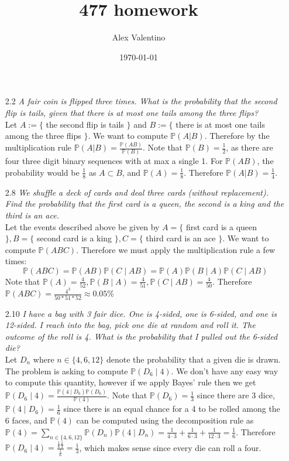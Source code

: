\documentclass[12pt, letterpaper]{article}
\date{\today}
\author{Alex Valentino}
\title{477 homework}
\newcommand{\Pro}{\mathbb{P}}
\begin{document}
\begin{enumerate}
	\item[2.2] \textit{A fair coin is flipped three times. What is the probability that
the second flip is tails, given that there is at most one tails among the three
flips?}\\
	Let $A := \{$ the second flip is tails $\}$ and $B := \{$ there is at most one tails among the three flips $\}$.  We want to compute $\Pro(A | B)$.  Therefore by the multiplication rule $\Pro(A | B) = \frac{\Pro(AB)}{\Pro(B)}$.  Note that $\Pro(B) = \frac{1}{2}$, as there are four three digit binary sequences with at max a single 1.  For $\Pro(AB)$, the probability would be $\frac{1}{8}$ as $A \subset B$, and $\Pro(A) = \frac{1}{8}$.  Therefore $\Pro(A|B) = \frac{1}{4}$.  
	\item[2.8] \textit{We shuffle a deck of cards and deal three cards (without replacement). Find the probability that the first card is a queen, the second is a king
and the third is an ace.}\\
	Let the events described above be given by $A = \{$ first card is a queen $\}, B = \{$ second card is a king $\}, C=\{$ third card is an ace $\}.$  We want to compute $\Pro(ABC)$.  Therefore we must apply the multiplication rule a few times:
	$$
	\Pro(ABC) = \Pro(AB) \Pro(C\mid AB) = \Pro(A) \Pro(B \mid A) \Pro(C \mid AB)
	$$
	Note that $\Pro(A) =\frac{4}{52}, \Pro(B \mid A) = \frac{4}{51}, \Pro(C\mid AB) = \frac{4}{50}$.
	Therefore $\Pro(ABC) = \frac{4^3}{50*51*52} \approx 0.05\%$
	\item[2.10]  \textit{I have a bag with 3 fair dice. One is 4-sided, one is 6-sided, and
one is 12-sided. I reach into the bag, pick one die at random and roll it. The
outcome of the roll is 4. What is the probability that I pulled out the 6-sided die?}\\
	Let $D_n$ where $n \in \{4,6,12\}$ denote the probability that a given die is drawn. The problem is asking to compute $\Pro(D_6 \mid 4)$.  We don't have any easy way to compute this quantity, however if we apply Bayes' rule then we get $\Pro(D_6 \mid 4) = \frac{\Pro(4 \mid D_6)\Pro(D_6)}{\Pro(4)}$.
	Note that $\Pro(D_6) = \frac{1}{3}$ since there are 3 dice, 
	$\Pro(4 \mid D_6) = \frac{1}{6}$ since there is an equal chance for a 4 to be rolled among the 6 faces, and $\Pro(4)$ can be computed using the decomposition rule as $\Pro(4) = \sum_{n \in \{4,6,12\}}\Pro(D_n)\Pro(4\mid D_n) = \frac{1}{4\cdot3} + \frac{1}{6\cdot3} + \frac{1}{12\cdot 3} = \frac{1}{6}$.  Therefore $\Pro(D_6 \mid 4) = \frac{\frac{1}{6}\frac{1}{3}}{\frac{1}{6}} = \frac{1}{3}$, which makes sense since every die can roll a four.

\end{enumerate}
\end{document}
